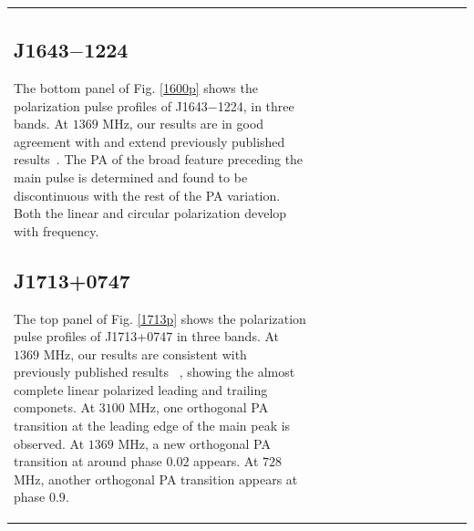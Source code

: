 \documentclass[useAMS,usenatbib]{mn2e}
\begin{document}
\begin{table}
\begin{center}
\begin{tabular}{lcccccccccccc}
%
%
%


\subsection{J1643$-$1224}

The bottom panel of Fig. \ref{1600p} shows the polarization pulse profiles of 
J1643$-$1224, in three bands.
%
At $1369$ MHz, our results are in good agreement with and extend previously published
results~\citep{Ord04,Yan11}.
%
The PA of the broad feature preceding the main pulse is determined and found to be 
discontinuous with the rest of the PA variation.
%
Both the linear and circular polarization develop with frequency.


\subsection{J1713+0747}

The top panel of Fig. \ref{1713p} shows the polarization pulse profiles of J1713+0747 
in three bands.
%
At $1369$ MHz, our results are consistent with previously published results
~\citep{Ord04,Yan11}, showing the almost complete linear polarized leading and 
trailing componets.
%
At $3100$ MHz, one orthogonal PA transition at the leading edge of the main peak 
is observed. At $1369$ MHz, a new orthogonal PA transition at around phase $0.02$
appears. At $728$ MHz, another orthogonal PA transition appears at phase $0.9$.
%


\end{tabular}
\end{center}
\end{table}
\end{document}
